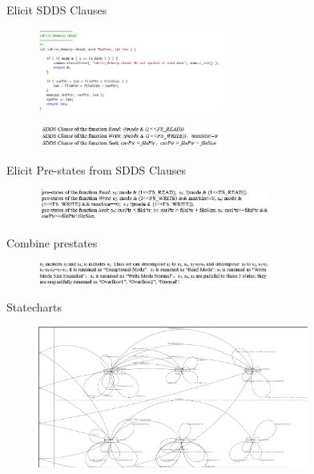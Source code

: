 ﻿\documentclass{beamer}
\begin{document}
\begin{frame}{Elicit SDDS Clauses}
      \begin{figure}
      \includegraphics[width=2.4in]{img/3.JPG}
      \end{figure}
      \begin{figure}
      \includegraphics[width=2.4in]{img/4.JPG}
      \end{figure}
\end{frame}
\begin{frame}{Elicit Pre-states from SDDS Clauses}
  \begin{figure}
    \includegraphics[width=3.0in]{img/5.JPG}
  \end{figure}
\end{frame}
\begin{frame}{Combine prestates}
  \begin{figure}
    \includegraphics[width=3.0in]{img/6.JPG}
  \end{figure}
\end{frame}
\begin{frame}{Statecharts}
  \begin{figure}
    \includegraphics[width=3.5in]{img/7.PNG}
  \end{figure}
\end{frame}
\end{document}
